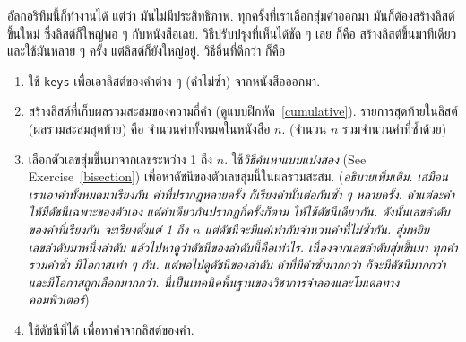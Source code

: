 %

อัลกอริทึมนี้ก็ทำงานได้ แต่ว่า มันไม่มีประสิทธิภาพ.
ทุกครั้งที่เราเลือกสุ่มคำออกมา มันก็ต้องสร้างลิสต์ขึ้นใหม่ ซึ่งลิสต์ก็ใหญ่พอ ๆ กับหนังสือเลย.
วิธีปรับปรุงที่เห็นได้ชัด ๆ เลย ก็คือ สร้างลิสต์ขึ้นมาทีเดียว และใช้มันหลาย ๆ ครั้ง
แต่ลิสต์ก็ยังใหญ่อยู่.
วิธีอื่นที่ดีกว่า ก็คือ

\begin{enumerate}


\item ใช้ \texttt{keys} เพื่อเอาลิสต์ของคำต่าง ๆ (คำไม่ซ้ำ) จากหนังสือออกมา.


\item สร้างลิสต์ที่เก็บผลรวมสะสมของความถี่คำ (ดูแบบฝึกหัด~\ref{cumulative}).
รายการสุดท้ายในลิสต์ (ผลรวมสะสมสุดท้าย) คือ จำนวนคำทั้งหมดในหนังสือ $n$. (จำนวน $n$ รวมจำนวนคำที่ซ้ำด้วย)
  

\item เลือกตัวเลขสุ่มขึ้นมาจากเลขระหว่าง 1 ถึง $n$.
ใช้\textit{วิธีค้นหาแบบแบ่งสอง} (See Exercise~\ref{bisection})
เพื่อหาดัชนีของตัวเลขสุ่มนี้ในผลรวมสะสม.
(\textit{อธิบายเพิ่มเติม. 
เสมือนเราเอาคำทั้งหมดมาเรียงกัน 
คำที่ปรากฎหลายครั้ง ก็เรียงคำนั้นต่อกันซ้ำ ๆ หลายครั้ง.
คำแต่ละคำให้มีดัชนีเฉพาะของตัวเอง แต่คำเดียวกันปรากฏกี่ครั้งก็ตาม ให้ใช้ดัชนีเดียวกัน.
ดังนั้นเลขลำดับของคำที่เรียงกัน จะเรียงตั้งแต่ 1 ถึง $n$
แต่ดัชนีจะมีแค่เท่ากับจำนวนคำที่ไม่ซ้ำกัน.
สุ่มหยิบเลขลำดับมาหนึ่งลำดับ แล้วไปหาดูว่าดัชนีของลำดับนี้คือเท่าไร.
เนื่องจากเลขลำดับสุ่มขึ้นมา ทุกคำรวมคำซ้ำ มีโอกาสเท่า ๆ กัน.
แต่พอไปดูดัชนีของลำดับ คำที่มีคำซ้ำมากกว่า ก็จะมีดัชนีมากกว่าและมีโอกาสถูกเลือกมากกว่า.
นี่เป็นเทคนิคพื้นฐานของวิชาการจำลองและโมเดลทางคอมพิวเตอร์})


\item ใช้ดัชนีที่ได้ เพื่อหาคำจากลิสต์ของคำ.

\end{enumerate}



